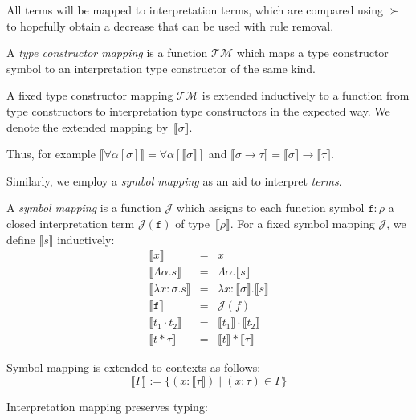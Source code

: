 \documentclass[runningheads,a4paper]{llncs}
\newcommand{\Typemap}{\mathcal{T\!M}}
\newcommand{\Termmap}{\mathcal{J}}
\newcommand{\quant}[2]{\forall #1[#2]}
\newcommand{\typeinterpret}[1]{\llbracket #1 \rrbracket}
\newcommand{\interpret}[1]{\llbracket #1 \rrbracket}
\newcommand{\itp}[1]{\llbracket #1 \rrbracket}
\newcommand{\arrtype}{\rightarrow}
\newcommand{\abs}[2]{\lambda #1.#2}
\newcommand{\tabs}[2]{\Lambda #1.#2}
\newcommand{\app}[2]{#1 \cdot #2}
\newcommand{\tapp}[2]{#1 * #2}
\begin{document}
All terms will be mapped to interpretation terms, which are compared
using $\succ$ to hopefully obtain a decrease that can be used with
rule removal.

\begin{definition}\normalfont
A \emph{type constructor mapping} is a function $\Typemap$ which maps
a type constructor symbol to an interpretation type constructor of the
same kind.

A fixed type constructor mapping $\Typemap$ is extended inductively to
a function from type constructors to interpretation type constructors
in the expected way. We denote the extended mapping
by~$\typeinterpret{\sigma}$.
\end{definition}

Thus, for example $\typeinterpret{\quant{\alpha}{\sigma}} =
\quant{\alpha}{\typeinterpret{\sigma}}$ and $\typeinterpret{\sigma
\arrtype \tau} = \typeinterpret{\sigma} \arrtype \typeinterpret{\tau}$.

Similarly, we employ a \emph{symbol mapping} as an aid to interpret
\emph{terms}.

\begin{definition}\normalfont
  A \emph{symbol mapping} is a function $\Termmap$ which assigns to
  each function symbol $\mathtt{f} : \rho$ a closed interpretation
  term $\Termmap(\mathtt{f})$ of type~$\typeinterpret{\rho}$. For a
  fixed symbol mapping $\Termmap$, we define $\interpret{s}$
  inductively:
  \[
    \begin{array}{rcl}
      \interpret{x} & = & x \\
      \interpret{\tabs{\alpha}{s}} & = & \tabs{\alpha}{\interpret{s}} \\
      \interpret{\abs{x:\sigma}{s}} & = & \abs{x:\typeinterpret{\sigma}}{
                                          \interpret{s}} \\
      \interpret{\mathtt{f}} &=& \Termmap(f) \\
      \interpret{\app{t_1}{t_2}} &=& \app{\interpret{t_1}}{\interpret{t_2}} \\
      \interpret{\tapp{t}{\tau}} &=& \tapp{\interpret{t}}{\typeinterpret{\tau}}
    \end{array}
  \]

  Symbol mapping is extended to contexts as follows:
  \[
    \itp{\Gamma} := \{ (x : \typeinterpret{\tau}) \mid (x : \tau) \in \Gamma \}
  \]
\end{definition}

Interpretation mapping preserves typing:
\end{document}
